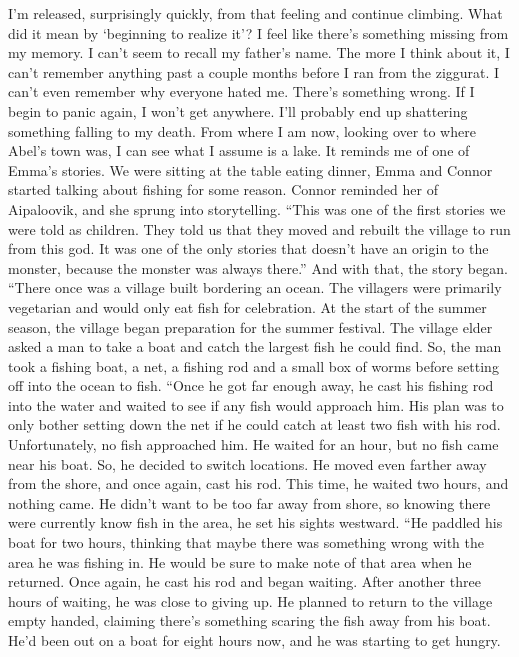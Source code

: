 \documentclass[openany, 12pt]{book}
\newcommand\tab[1][1cm]{\hspace*{#1}}
\begin{document}
\newline
\tab
I’m released, surprisingly quickly, from that feeling and continue climbing. What did it mean by ‘beginning to realize it’? I feel like there’s something missing from my memory. I can’t seem to recall my father’s name. The more I think about it, I can’t remember anything past a couple months before I ran from the ziggurat.  I can’t even remember why everyone hated me. There’s something wrong. 
\newline
\tab
If I begin to panic again, I won’t get anywhere. I’ll probably end up shattering something falling to my death. From where I am now, looking over to where Abel’s town was, I can see what I assume is a lake. It reminds me of one of Emma’s stories. We were sitting at the table eating dinner, Emma and Connor started talking about fishing for some reason. Connor reminded her of Aipaloovik, and she sprung into storytelling.
\newline
\tab
``This was one of the first stories we were told as children. They told us that they moved and rebuilt the village to run from this god. It was one of the only stories that doesn’t have an origin to the monster, because the monster was always there.'' And with that, the story began.
\newline
\tab
``There once was a village built bordering an ocean. The villagers were primarily vegetarian and would only eat fish for celebration. At the start of the summer season, the village began preparation for the summer festival. The village elder asked a man to take a boat and catch the largest fish he could find. So, the man took a fishing boat, a net, a fishing rod and a small box of worms before setting off into the ocean to fish.
\newline
\tab
``Once he got far enough away, he cast his fishing rod into the water and waited to see if any fish would approach him. His plan was to only bother setting down the net if he could catch at least two fish with his rod. Unfortunately, no fish approached him. He waited for an hour, but no fish came near his boat. So, he decided to switch locations. He moved even farther away from the shore, and once again, cast his rod. This time, he waited two hours, and nothing came. He didn’t want to be too far away from shore, so knowing there were currently know fish in the area, he set his sights westward.
\newline
\tab
``He paddled his boat for two hours, thinking that maybe there was something wrong with the area he was fishing in. He would be sure to make note of that area when he returned. Once again, he cast his rod and began waiting. After another three hours of waiting, he was close to giving up. He planned to return to the village empty handed, claiming there’s something scaring the fish away from his boat. He’d been out on a boat for eight hours now, and he was starting to get hungry.
\end{document}
